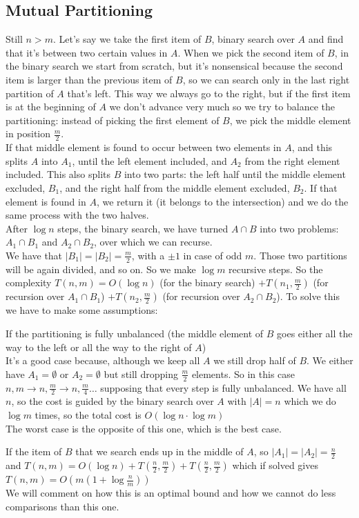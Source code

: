 \documentclass[10pt]{report}
\begin{document}
\subsection{Mutual Partitioning} Still $n > m$. Let's say we take the first item of $B$, binary search over $A$ and find that it's between two certain values in $A$. When we pick the second item of $B$, in the binary search we start from scratch, but it's nonsensical because the second item is larger than the previous item of $B$, so we can search only in the last right partition of $A$ that's left. This way we always go to the right, but if the first item is at the beginning of $A$ we don't advance very much so we try to balance the partitioning: instead of picking the first element of $B$, we pick the middle element in position $\frac{m}{2}$.\\ If that middle element is found to occur between two elements in $A$, and this splits $A$ into $A_1$, until the left element included, and $A_2$ from the right element included. This also splits $B$ into two parts: the left half until the middle element excluded, $B_1$, and the right half from the middle element excluded, $B_2$. If that element is found in $A$, we return it (it belongs to the intersection) and we do the same process with the two halves.\\
After $\log n$ steps, the binary search, we have turned $A \cap B$ into two problems: $A_1 \cap B_1$ and $A_2 \cap B_2$, over which we can recurse.\\
We have that $|B_1| = |B_2| = \frac{m}{2}$, with a $\pm 1$ in case of odd $m$. Those two partitions will be again divided, and so on. So we make $\log m$ recursive steps. So the complexity $T(n, m) = O(\log n)$ (for the binary search) $+ T(n_1, \frac{m}{2})$ (for recursion over $A_1 \cap B_1$) $+ T(n_2, \frac{m}{2})$ (for recursion over $A_2\cap B_2$). To solve this we have to make some assumptions:
\begin{list}{}{}
	\item If the partitioning is fully unbalanced (the middle element of $B$ goes either all the way to the left or all the way to the right of $A$)\\
	 It's a good case because, although we keep all $A$ we still drop half of $B$. We either have $A_1 = \emptyset$ or $A_2 = \emptyset$ but still dropping $\frac{m}{2}$ elements. So in this case $n,m \rightarrow n, \frac{m}{2}\rightarrow n, \frac{m}{4}\ldots$ supposing that every step is fully unbalanced. We have all $n$, so the cost is guided by the binary search over $A$ with $|A| = n$ which we do $\log m$ times, so the total cost is $O(\log n \cdot \log m)$\\
	 The worst case is the opposite of this one, which is the best case.
	 \item If the item of $B$ that we search ends up in the middle of $A$, so $|A_1| = |A_2| = \frac{n}{2}$ and $T(n, m) = O(\log n) + T(\frac{n}{2}, \frac{m}{2}) + T(\frac{n}{2}, \frac{m}{2})$ which if solved gives $T(n, m) = O(m(1 + \log\frac{n}{m}))$\\
	 We will comment on how this is an optimal bound and how we cannot do less comparisons than this one.
\end{list}
\end{document}
